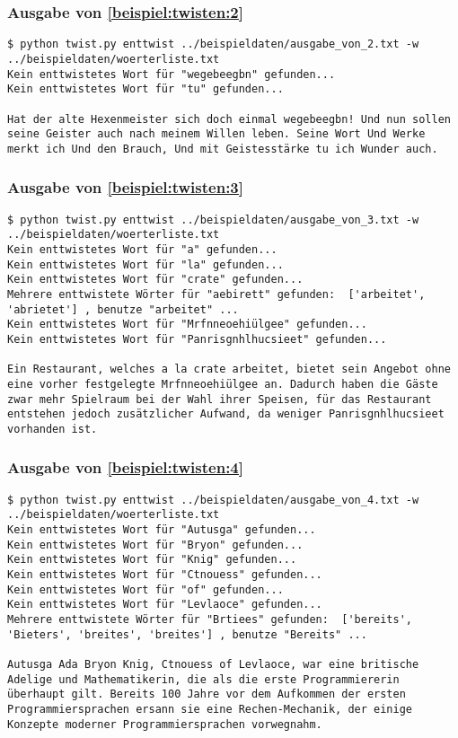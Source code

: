 \documentclass[a4paper,10pt,ngerman]{scrartcl}
\begin{document}
\subsubsection{Ausgabe von \ref{beispiel:twisten:2}}
\label{beispiel:enttwisten:2}
\begin{lstlisting}[breaklines=true]
$ python twist.py enttwist ../beispieldaten/ausgabe_von_2.txt -w ../beispieldaten/woerterliste.txt
Kein enttwistetes Wort für "wegebeegbn" gefunden...
Kein enttwistetes Wort für "tu" gefunden...

Hat der alte Hexenmeister sich doch einmal wegebeegbn! Und nun sollen seine Geister auch nach meinem Willen leben. Seine Wort Und Werke merkt ich Und den Brauch, Und mit Geistesstärke tu ich Wunder auch.
\end{lstlisting}

\subsubsection{Ausgabe von \ref{beispiel:twisten:3}}
\label{beispiel:enttwisten:3}
\begin{lstlisting}[breaklines=true]
$ python twist.py enttwist ../beispieldaten/ausgabe_von_3.txt -w ../beispieldaten/woerterliste.txt
Kein enttwistetes Wort für "a" gefunden...
Kein enttwistetes Wort für "la" gefunden...
Kein enttwistetes Wort für "crate" gefunden...
Mehrere enttwistete Wörter für "aebirett" gefunden:  ['arbeitet', 'abrietet'] , benutze "arbeitet" ...
Kein enttwistetes Wort für "Mrfnneoehiülgee" gefunden...
Kein enttwistetes Wort für "Panrisgnhlhucsieet" gefunden...

Ein Restaurant, welches a la crate arbeitet, bietet sein Angebot ohne eine vorher festgelegte Mrfnneoehiülgee an. Dadurch haben die Gäste zwar mehr Spielraum bei der Wahl ihrer Speisen, für das Restaurant entstehen jedoch zusätzlicher Aufwand, da weniger Panrisgnhlhucsieet vorhanden ist.
\end{lstlisting}

\subsubsection{Ausgabe von \ref{beispiel:twisten:4}}
\label{beispiel:enttwisten:4}
\begin{lstlisting}[breaklines=true]
$ python twist.py enttwist ../beispieldaten/ausgabe_von_4.txt -w ../beispieldaten/woerterliste.txt
Kein enttwistetes Wort für "Autusga" gefunden...
Kein enttwistetes Wort für "Bryon" gefunden...
Kein enttwistetes Wort für "Knig" gefunden...
Kein enttwistetes Wort für "Ctnouess" gefunden...
Kein enttwistetes Wort für "of" gefunden...
Kein enttwistetes Wort für "Levlaoce" gefunden...
Mehrere enttwistete Wörter für "Brtiees" gefunden:  ['bereits', 'Bieters', 'breites', 'breites'] , benutze "Bereits" ...

Autusga Ada Bryon Knig, Ctnouess of Levlaoce, war eine britische Adelige und Mathematikerin, die als die erste Programmiererin überhaupt gilt. Bereits 100 Jahre vor dem Aufkommen der ersten Programmiersprachen ersann sie eine Rechen-Mechanik, der einige Konzepte moderner Programmiersprachen vorwegnahm.
\end{lstlisting}
\end{document}
